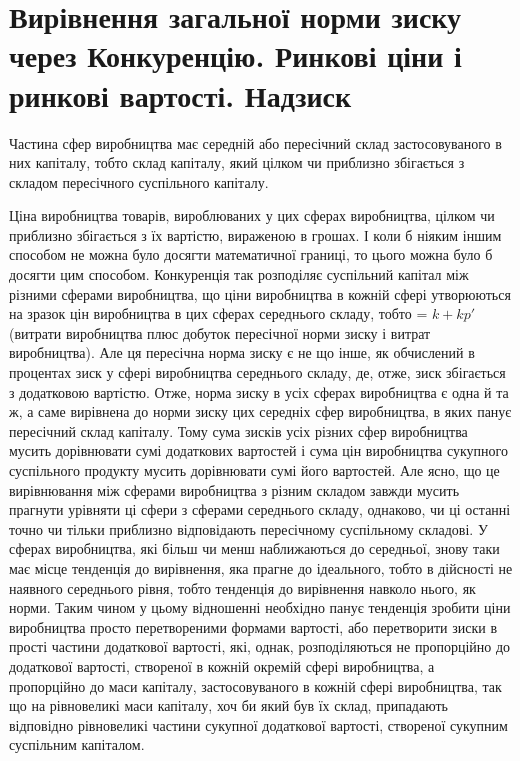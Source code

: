 \section{Вирівнення загальної норми зиску через
Конкуренцію. Ринкові ціни і ринкові вартості.
Надзиск}

Частина сфер виробництва має середній або пересічний склад
застосовуваного в них капіталу, тобто склад капіталу, який цілком чи приблизно збігається з складом
пересічного суспільного
капіталу.

Ціна виробництва товарів, вироблюваних у цих сферах виробництва, цілком чи приблизно збігається з їх
вартістю, вираженою
в грошах. І коли б ніяким іншим способом не можна було досягти математичної границі, то цього можна
було б досягти цим
способом. Конкуренція так розподіляє суспільний капітал між
різними сферами виробництва, що ціни виробництва в кожній
сфері утворюються на зразок цін виробництва в цих сферах
середнього складу, тобто = $k + kp'$ (витрати виробництва плюс
добуток пересічної норми зиску і витрат виробництва). Але
ця пересічна норма зиску є не що інше, як обчислений в процентах зиск у сфері виробництва середнього
складу, де, отже,
зиск збігається з додатковою вартістю. Отже, норма зиску в усіх
сферах виробництва є одна й та ж, а саме вирівнена до норми
зиску цих середніх сфер виробництва, в яких панує пересічний
склад капіталу. Тому сума зисків усіх різних сфер виробництва
мусить дорівнювати сумі додаткових вартостей і сума цін виробництва сукупного суспільного продукту
мусить дорівнювати
сумі його вартостей. Але ясно, що це вирівнювання між сферами виробництва з різним складом завжди
мусить прагнути
урівняти ці сфери з сферами середнього складу, однаково, чи
ці останні точно чи тільки приблизно відповідають пересічному
суспільному складові. У сферах виробництва, які більш чи менш
наближаються до середньої, знову таки має місце тенденція
до вирівнення, яка прагне до ідеального, тобто в дійсності не
наявного середнього рівня, тобто тенденція до вирівнення
навколо нього, як норми. Таким чином у цьому відношенні
необхідно панує тенденція зробити ціни виробництва просто
перетвореними формами вартості, або перетворити зиски в
прості частини додаткової вартості, які, однак, розподіляються
не пропорційно до додаткової вартості, створеної в кожній
окремій сфері виробництва, а пропорційно до маси капіталу,
застосовуваного в кожній сфері виробництва, так що на рівновеликі маси капіталу, хоч би який був їх
склад, припадають відповідно рівновеликі частини сукупної додаткової вартості, створеної сукупним
суспільним капіталом.

